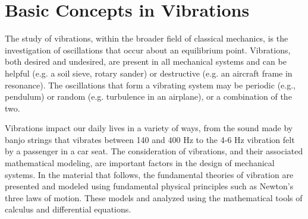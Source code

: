 \documentclass[12pt,letter]{article}
\numberwithin{ex}{section} %
\numberwithin{re}{section} %
\numberwithin{vcs}{section} %
\begin{document}
	
	\setcounter{section}{0}	
	\setcounter{figure}{0}   
	\renewcommand\thefigure{\thesection.\arabic{figure}}
	\setcounter{equation}{0}   
	\renewcommand\theequation{\thesection.\arabic{equation}}

	\section{Basic Concepts in Vibrations}

    The study of vibrations, within the broader field of classical mechanics, is the investigation of oscillations that occur about an equilibrium point. Vibrations, both desired and undesired, are present in all mechanical systems and can be helpful (e.g. a soil sieve, rotary sander) or destructive (e.g. an aircraft frame in resonance). The oscillations that form a vibrating system may be periodic (e.g., pendulum) or random (e.g. turbulence in an airplane), or a combination of the two. 

    Vibrations impact our daily lives in a variety of ways, from the sound made by banjo strings that vibrates between 140 and 400 Hz to the 4-6 Hz vibration felt by a passenger in a car seat. The consideration of vibrations, and their associated mathematical modeling, are important factors in the design of mechanical systems. In the material that follows, the fundamental theories of vibration are presented and modeled using fundamental physical principles such as Newton's three laws of motion. These models and analyzed using the mathematical tools of calculus and differential equations. 
\end{document}
